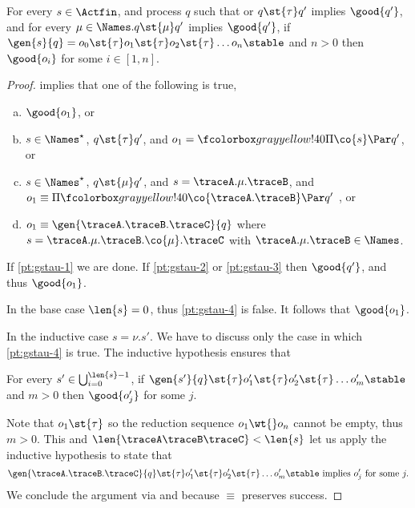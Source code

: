 \begin{lemma}
\label{lem:stable-derivative-gs-happy}
For every $s \in \Actfin$, and process $q$
such that or $q \st{\tau} q'$ implies $\good{q'}$,
and for every $\mu \in \Names. q \st{\mu} q'$ implies $\good{q'}$,
if $\gen{s}{q} = o_0 \st{\tau} o_1 \st{\tau} o_2 \st{\tau} \ldots o_n \stable$ and $n > 0$ then $\good{o_i}$ for some $i \in [1,n]$.
\end{lemma}
\begin{proof}
   implies that one of the following is true,
  \begin{enumerate}[(a)]
  \item\label{pt:gstau-1} $\good{o_1}$, or
  \item\label{pt:gstau-2} $s \in \Names^\star$, $q \st{\tau} q'$, and $o_1 = \mailbox{ \Pi \co{s} } \Par q'$, or
  \item\label{pt:gstau-3} $s \in \Names^\star$, $q \st{\mu} q'$, and $s =  \traceA . \mu . \traceB$, and $o_1 \equiv \Pi \mailbox{ \co{\traceA.\traceB} } \Par q'$ , or
  \item\label{pt:gstau-4} $o_1 \equiv \gen{\traceA.\traceB.\traceC}{q}$ where $ s = \traceA . \mu . \traceB . \co{\mu} . \traceC$ with $ \traceA . \mu  . \traceB \in \Names$.
  \end{enumerate}
  If \ref{pt:gstau-1} we are done.
  If \ref{pt:gstau-2} or \ref{pt:gstau-3} then $\good{q'}$, and thus $\good{o_1}$.

  In the base case $\len{s} = 0$, thus \ref{pt:gstau-4} is false. It follows that $\good{o_1}$.

  In the inductive case $s = \nu . s'$.
  We have to discuss only the case in which \ref{pt:gstau-4} is true.
  The inductive hypothesis ensures that
  \begin{center}
    For every $s' \in \bigcup_{i = 0}^{\len{s}-1}$, if $\gen{s'}{q} \st{\tau} o'_1 \st{\tau} o'_2 \st{\tau} \ldots o'_m \stable$ and $m > 0$
    then $\good{o'_j}$ for some $j$.
  \end{center}
  Note that $ o_1 \st{\tau} $ so the reduction sequence $o_1 \wt{} o_n$ cannot be empty, thus $ m > 0$. This and  $\len{\traceA\traceB\traceC} < \len{s}$
  let us apply the inductive hypothesis to state that
  $$
  \gen{\traceA.\traceB.\traceC}{q} \st{\tau} o'_1 \st{\tau} o'_2 \st{\tau} \ldots o'_m \stable
  \text{ implies } o'_j \text{ for some } j.
  $$
  We conclude the argument via  and because $\equiv$ preserves success.
\end{proof}



